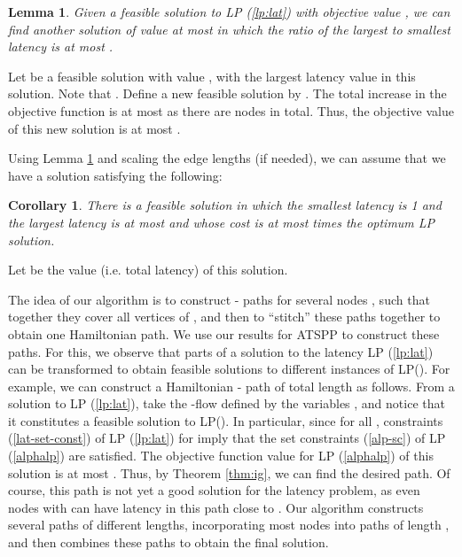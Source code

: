 \documentclass[11pt]{article}
\newcommand{\qed}{\hspace*{\fill}}
\newtheorem{lemma}[theorem]{Lemma}
\newtheorem{corollary}[theorem]{Corollary}
\newenvironment{proof}[1][Proof. ]{\noindent {\bf #1 }}{\qed}
\begin{document}
\begin{lemma}\label{lem:scale}
Given a feasible solution to LP (\ref{lp:lat}) with objective value
, we can find another solution of value at most  in which the ratio of
the largest to smallest latency  is at most .
\end{lemma}
\begin{proof}
Let  be a feasible solution with value , with  the largest latency value in this solution. Note that .
Define a new feasible solution  by .
The total increase in the objective function is at most  as there are  nodes in total. Thus, the objective value of this new solution is at most .
\end{proof}

\medskip



Using Lemma \ref{lem:scale} and scaling the edge lengths (if needed), 
we can assume that we have a solution  satisfying the following:

\begin{corollary} \label{cor:lstar}
There is a feasible solution 
in which the smallest latency is 1 and the largest latency is at most  and whose cost is at most  times the optimum LP solution.
\end{corollary}

\noindent
Let  be the value (i.e. total latency) of this solution.

The idea of our algorithm is to construct - paths for several nodes , such that together they cover all vertices of , and then to ``stitch'' these paths together to obtain one Hamiltonian path. We use our results for ATSPP to construct these paths.  For this, we observe that parts of a solution to the latency  LP (\ref{lp:lat}) can be transformed to obtain feasible solutions to different instances of 
LP().  For example, we can construct a Hamiltonian - path of total length  as follows. From a solution to LP (\ref{lp:lat}), take the -flow defined by the variables , and notice that it constitutes a feasible solution to LP(). In particular, since  for all , constraints (\ref{lat-set-const}) of LP (\ref{lp:lat}) for   imply that the set constraints (\ref{alp-sc}) of LP (\ref{alphalp}) are satisfied.  The objective function value for LP (\ref{alphalp}) of this solution is at most . Thus, by Theorem \ref{thm:ig}, we can find the desired path. Of course, this path is not yet a good solution for the latency problem, as even nodes  with  can have latency in this path close to .  Our algorithm constructs several paths of different lengths, incorporating most nodes  into paths of length , and then combines these paths to obtain the final solution.
\end{document}
